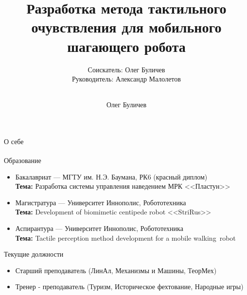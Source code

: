\documentclass[aspectratio=169,xcolor=table]{beamer}
\title[]{Разработка метода тактильного очувствления для мобильного шагающего робота} %
\subtitle{Соискатель: Олег Буличев \\ Руководитель: Александр Малолетов \\ \ } %
\author{Олег Буличев}
\newcommand{\fbckg}[1]{\usebackgroundtemplate{\texttt{[image: \#1]}}}%
\begin{document}
\setlength{\abovedisplayskip}{0pt}
\setlength{\belowdisplayskip}{0pt}
\setlength{\abovedisplayshortskip}{0pt}
\setlength{\belowdisplayshortskip}{0pt}

\fbckg{fibeamer/figs/title_page.png}

\fbckg{fibeamer/figs/common.png}

\begin{frame}[t]{О себе}
    \framesubtitle{}
    \vspace{-0.2cm}
    \begin{exampleblock}{Образование}
        \vspace{-0.2cm}
        \begin{itemize}
            \item Бакалавриат --- МГТУ им. Н.Э. Баумана, РК6 (красный диплом) \\ \textbf{Тема:} Разработка системы управления наведением МРК <<Пластун>>
            \item Магистратура --- Университет Иннополис, Робототехника \\ \textbf{Тема:} Development of biomimetic centipede robot <<StriRus>>
            \item Аспирантура --- Университет Иннополис, Робототехника \\ \textbf{Тема:} Tactile perception method development for a mobile walking~robot
        \end{itemize}
    \end{exampleblock}
    \begin{alertblock}{Текущие должности}
        \vspace{-0.2cm}
        \begin{itemize}
            \item Старший преподаватель (ЛинАл, Механизмы и Машины, ТеорМех)
            \item Тренер - преподаватель (Туризм, Историческое фехтование, Народные игры)
        \end{itemize}
    \end{alertblock}
\end{frame}
\end{document}
